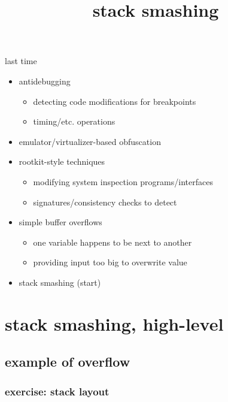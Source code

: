\graphicspath{{./figures/}}
\title{stack smashing}
\date{}

\begin{frame}
    \titlepage
\end{frame}

\begin{frame}{last time}
    \begin{itemize}
    \item antidebugging
        \begin{itemize}
        \item detecting code modifications for breakpoints
        \item timing/etc. operations
        \end{itemize}
    \item emulator/virtualizer-based obfuscation
    \item rootkit-style techniques
        \begin{itemize}
        \item modifying system inspection programs/interfaces
        \item signatures/consistency checks to detect
        \end{itemize}
    \item simple buffer overflows
        \begin{itemize}
        \item one variable happens to be next to another
        \item providing input too big to overwrite value
        \end{itemize}
    \item stack smashing (start)
    \end{itemize}
\end{frame}

\usetikzlibrary{arrows.meta,calc,matrix,positioning}

\section{stack smashing, high-level}


\subsection{example of overflow}


\subsubsection{exercise: stack layout}


